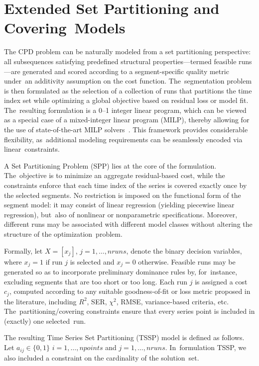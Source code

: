 \documentclass[mathematics,article,accept,pdftex,moreauthors]{Definitions/mdpi}
\begin{document}
\section{Extended Set Partitioning and Covering~Models}  \label{sec:SCPmodel}
The CPD problem can be naturally modeled from a set partitioning perspective: all subsequences satisfying predefined structural properties—termed feasible runs—are generated and scored according to a segment-specific quality metric under~an additivity assumption on the cost function. The~segmentation problem is then formulated as the selection of a collection of runs that partitions the time index set while optimizing a global objective based on residual loss or model fit. The~resulting formulation is a 0–1 integer linear program, which can be viewed as a special case of a mixed-integer linear program (MILP), thereby allowing for the use of state-of-the-art MILP solvers~\cite{FLS09}. This framework provides considerable flexibility, as~additional modeling requirements can be seamlessly encoded via linear~constraints.

A Set Partitioning Problem (SPP) lies at the core of the formulation. The~objective is to minimize an aggregate residual-based cost, while the constraints enforce that each time index of the series is covered exactly once by the selected segments. No restriction is imposed on the functional form of the segment model: it may consist of linear regression (yielding piecewise linear regression), but~also of nonlinear or nonparametric specifications. Moreover, different runs may be associated with different model classes without altering the structure of the optimization~problem.

Formally, let $X = [x_j]$, $j = 1,\ldots,nruns$, denote the binary decision variables, where $x_j = 1$ if run $j$ is selected and $x_j = 0$ otherwise. Feasible runs may be generated so as to incorporate preliminary dominance rules by, for~instance, excluding segments that are too short or too long. Each run $j$ is assigned a cost $c_j$, computed according to any suitable goodness-of-fit or loss metric proposed in the literature, including $R^2$, SER, $\chi^2$, RMSE, variance-based criteria, etc. The~partitioning/covering constraints ensure that every series point is included in (exactly) one selected~run.

The resulting Time Series Set Partitioning (TSSP) model is defined as follows. Let \linebreak  $a_{ij} \in \{0,1\}$  \linebreak  $i = 1,\ldots,npoints$ and $j = 1,\ldots,nruns$. In~formulation TSSP, we also included a constraint on the cardinality of the solution~set. %
\end{document}

